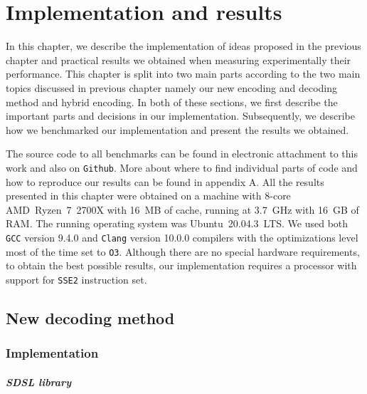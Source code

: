 \chapter{Implementation and results}
\label{kap:kap4}

In this chapter, we describe the implementation of ideas proposed in the previous
chapter and practical results we obtained when measuring experimentally their performance.
This chapter is split into two main parts according to the two main topics discussed
in previous chapter namely our new encoding and decoding method and hybrid encoding.
In both of these sections, we first describe the important parts and decisions in our
implementation. Subsequently, we describe how we benchmarked our implementation and present
the results we obtained.

The source code to all benchmarks can be found in electronic attachment to this work
and also on \texttt{Github}. More about where to find individual parts of code and how
to reproduce our results can be found in
appendix A. All the results presented in this chapter were obtained on a machine with
8-core AMD~Ryzen~7~2700X with 16~MB of cache, running at 3.7~GHz with 16~GB of RAM.
The running operating system was Ubuntu~20.04.3~LTS. We used both \texttt{GCC} version
9.4.0 and \texttt{Clang} version 10.0.0 compilers with the optimizations level most of
the time set to \texttt{O3}. Although there are no special hardware requirements, to
obtain the best possible results, our implementation requires a processor with support
for \texttt{SSE2} instruction set.

\section{New decoding method}

\subsection{Implementation}

\paragraph{SDSL library}

